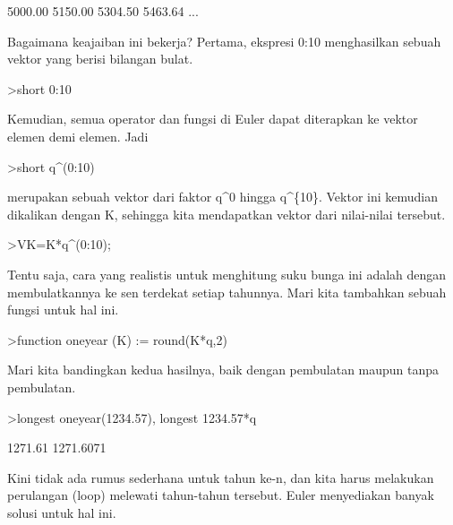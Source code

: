 \documentclass{article}
\newenvironment{eulernotebook}{\par}{\par}
\newenvironment{eulercomment}{\par\medskip}{\par\medskip}
\begin{document}
\begin{eulernotebook}
\begin{eulercomment}
\begin{eulercomment}
\begin{eulercomment}
\begin{eulercomment}
\begin{eulercomment}
\begin{eulercomment}
\begin{eulercomment}
\begin{eulercomment}
\begin{euleroutput}
      5000.00     5150.00     5304.50     5463.64     ...
\end{euleroutput}
\begin{eulercomment}
Bagaimana keajaiban ini bekerja? Pertama, ekspresi 0:10 menghasilkan
sebuah vektor yang berisi bilangan bulat.
\end{eulercomment}
\begin{eulerprompt}
>short 0:10
\end{eulerprompt}
\begin{euleroutput}
  [0,  1,  2,  3,  4,  5,  6,  7,  8,  9,  10]
\end{euleroutput}
\begin{eulercomment}
Kemudian, semua operator dan fungsi di Euler dapat diterapkan ke
vektor elemen demi elemen. Jadi
\end{eulercomment}
\begin{eulerprompt}
>short q^(0:10)
\end{eulerprompt}
\begin{euleroutput}
  [1,  1.03,  1.0609,  1.0927,  1.1255,  1.1593,  1.1941,  1.2299,
  1.2668,  1.3048,  1.3439]
\end{euleroutput}
\begin{eulercomment}
merupakan sebuah vektor dari faktor q\textasciicircum{}0 hingga q\textasciicircum{}\{10\}. Vektor ini
kemudian dikalikan dengan \textdollar{}K\textdollar{}, sehingga kita mendapatkan vektor dari
nilai-nilai tersebut.
\end{eulercomment}
\begin{eulerprompt}
>VK=K*q^(0:10);
\end{eulerprompt}
\begin{eulercomment}
Tentu saja, cara yang realistis untuk menghitung suku bunga ini adalah
dengan membulatkannya ke sen terdekat setiap tahunnya. Mari kita
tambahkan sebuah fungsi untuk hal ini.
\end{eulercomment}
\begin{eulerprompt}
>function oneyear (K) := round(K*q,2)
\end{eulerprompt}
\begin{eulercomment}
Mari kita bandingkan kedua hasilnya, baik dengan pembulatan maupun
tanpa pembulatan.
\end{eulercomment}
\begin{eulerprompt}
>longest oneyear(1234.57), longest 1234.57*q
\end{eulerprompt}
\begin{euleroutput}
                  1271.61 
                1271.6071 
\end{euleroutput}
\begin{eulercomment}
Kini tidak ada rumus sederhana untuk tahun ke-\textdollar{}n\textdollar{}, dan kita harus
melakukan perulangan (loop) melewati tahun-tahun tersebut. Euler
menyediakan banyak solusi untuk hal ini.


\end{eulercomment}
\end{eulercomment}
\end{eulercomment}
\end{eulercomment}
\end{eulercomment}
\end{eulercomment}
\end{eulercomment}
\end{eulercomment}
\end{eulercomment}
\end{eulernotebook}
\end{document}
